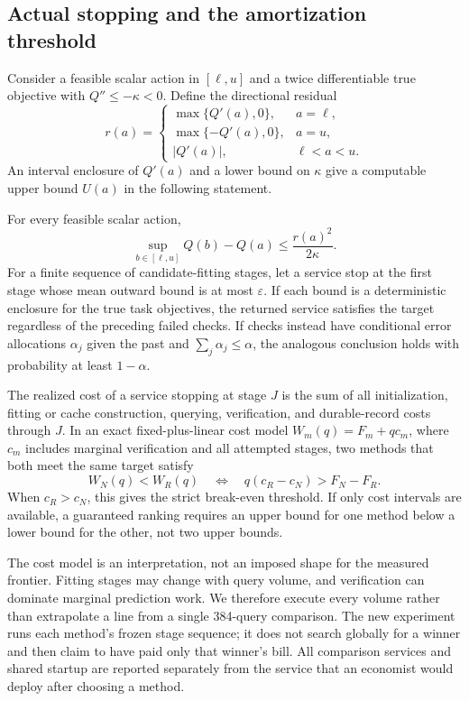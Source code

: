 \subsection{Actual stopping and the amortization threshold}
Consider a feasible scalar action in $[\ell,u]$ and a twice differentiable
true objective with $Q''\leq-\kappa<0$. Define the directional residual
\[
 r(a)=\begin{cases}
 \max\{Q'(a),0\},&a=\ell,\\
 \max\{-Q'(a),0\},&a=u,\\
 |Q'(a)|,&\ell<a<u.
 \end{cases}
\]
An interval enclosure of $Q'(a)$ and a lower bound on $\kappa$ give a
computable upper bound $U(a)$ in the following statement.
\begin{proposition}\label{prop:r19stopping}
For every feasible scalar action,
\begin{equation}
 \sup_{b\in[\ell,u]}Q(b)-Q(a)\leq\frac{r(a)^2}{2\kappa}.
 \label{eq:r19residual}
\end{equation}
For a finite sequence of candidate-fitting stages, let a service stop at the
first stage whose mean outward bound is at most $\varepsilon$. If each bound
is a deterministic enclosure for the true task objectives, the returned
service satisfies the target regardless of the preceding failed checks.
If checks instead have conditional error allocations $\alpha_j$ given the
past and $\sum_j\alpha_j\leq\alpha$, the analogous conclusion holds with
probability at least $1-\alpha$.

The realized cost of a service stopping at stage $J$ is the sum of all
initialization, fitting or cache construction, querying, verification, and
durable-record costs through $J$. In an exact fixed-plus-linear cost model
$W_m(q)=F_m+q c_m$, where $c_m$ includes marginal verification and all
attempted stages, two methods that both meet the same target satisfy
\begin{equation}
 W_N(q)<W_R(q)\quad\Longleftrightarrow\quad
 q(c_R-c_N)>F_N-F_R.
 \label{eq:r19break}
\end{equation}
When $c_R>c_N$, this gives the strict break-even threshold. If only cost
intervals are available, a guaranteed ranking requires an upper bound for
one method below a lower bound for the other, not two upper bounds.
\end{proposition}

The cost model is an interpretation, not an imposed shape for the measured
frontier. Fitting stages may change with query volume, and verification can
dominate marginal prediction work. We therefore execute every volume rather
than extrapolate a line from a single 384-query comparison. The new experiment
runs each method's frozen stage sequence; it does not search globally for a
winner and then claim to have paid only that winner's bill. All comparison
services and shared startup are reported separately from the service that
an economist would deploy after choosing a method.
